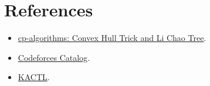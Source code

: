 \section*{References}

\begin{itemize}
  \item \href{https://cp-algorithms.com/geometry/convex_hull_trick.html}{cp-algorithms: Convex Hull Trick and Li Chao Tree}.
  \item \href{https://codeforces.com/catalog?locale=en}{Codeforces Catalog}.
  \item \href{https://github.com/kth-competitive-programming/kactl}{KACTL}.
\end{itemize}
